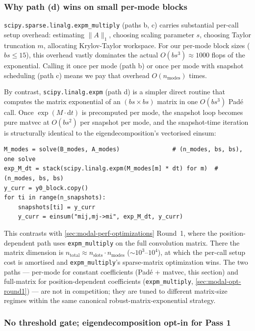\subsubsection{Why path (d) wins on small per-mode blocks}
\label{sec:modal-pade-vs-expm-multiply}

\texttt{scipy.sparse.linalg.expm\_multiply} (paths b, c) carries substantial per-call setup overhead: estimating $\|A\|_1$, choosing scaling parameter $s$, choosing Taylor truncation $m$, allocating Krylov-Taylor workspace. For our per-mode block sizes ($bs \le 15$), this overhead vastly dominates the actual $O(bs^3) \approx 1000$ flops of the exponential. Calling it once per mode (path b) or once per mode with snapshot scheduling (path c) means we pay that overhead $O(n_\text{modes})$ times.

By contrast, \texttt{scipy.linalg.expm} (path d) is a simpler direct routine that computes the matrix exponential of an $(bs \times bs)$ matrix in one $O(bs^3)$ Pad\'{e} call. Once $\exp(M \cdot \mathrm{d}t)$ is precomputed per mode, the snapshot loop becomes pure matvec at $O(bs^2)$ per snapshot per mode, and the snapshot-time iteration is structurally identical to the eigendecomposition's vectorised einsum:
\begin{verbatim}
M_modes = solve(B_modes, A_modes)               # (n_modes, bs, bs), one solve
exp_M_dt = stack(scipy.linalg.expm(M_modes[m] * dt) for m)  # (n_modes, bs, bs)
y_curr = y0_block.copy()
for ti in range(n_snapshots):
    snapshots[ti] = y_curr
    y_curr = einsum("mij,mj->mi", exp_M_dt, y_curr)
\end{verbatim}

This contrasts with \cref{sec:modal-perf-optimizations} Round~1, where the position-dependent path uses \texttt{expm\_multiply} on the full convolution matrix. There the matrix dimension is $n_\text{total} \approx n_\text{slots} \cdot n_\text{modes}$ ($\sim 10^3\text{--}10^4$), at which the per-call setup cost is amortised and \texttt{expm\_multiply}'s sparse-matrix optimization wins. The two paths --- per-mode for constant coefficients (Pad\'{e} + matvec, this section) and full-matrix for position-dependent coefficients (\texttt{expm\_multiply}, \cref{sec:modal-opt-round1}) --- are not in competition; they are tuned to different matrix-size regimes within the same canonical robust-matrix-exponential strategy.

\subsubsection{No threshold gate; eigendecomposition opt-in for Pass 1}
\label{sec:modal-pade-pass1}

